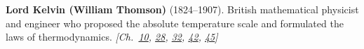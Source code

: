 \textbf{Lord Kelvin (William Thomson)} (1824–1907). British mathematical physicist and engineer who proposed the absolute temperature scale and formulated the laws of thermodynamics. \emph{[Ch.~\hyperref[ch:solarfusionquantumtunneling]{10}, \hyperref[ch:negativetemperature]{28}, \hyperref[ch:atomic]{32}, \hyperref[ch:iceslipperiness]{42}, \hyperref[ch:maxwelldemon]{45}]}

